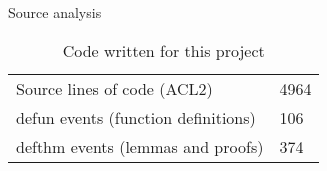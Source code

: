 \documentclass{beamer}
\begin{document}
\begin{frame}{Source analysis}
  \begin{table}[]
    \centering
    \caption{Code written for this project}
    \label{my-label}
    \begin{tabular}{ll}
      Source lines of code (ACL2)      & 4964 \\
      defun events (function definitions) & 106  \\
      defthm events (lemmas and proofs)   & 374 
    \end{tabular}
  \end{table}
\end{frame}
\end{document}
